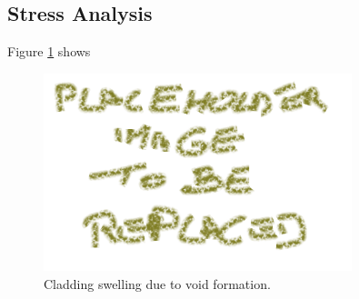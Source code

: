 \subsection{Stress Analysis}
Figure \ref{fig:stress_analysis} shows 

\begin{figure}[H]
\centering
\includegraphics[width=0.8\textwidth]{placeholder.png}
\caption{Cladding swelling due to void formation.}
\label{fig:stress_analysis}
\end{figure}
